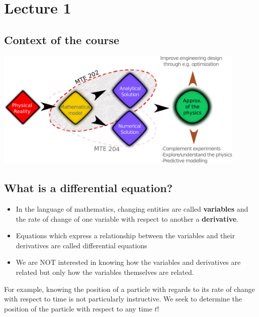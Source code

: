 \chapter*{Lecture 1}

\section*{Context of the course}


\includegraphics[width=0.9\textwidth]{figs/ConceptMap.pdf} 




\section{What is a differential equation?}

\begin{itemize}
\item In the language of mathematics, changing entities are called \textbf{variables} and the rate of change of one variable with respect to another a \textbf{derivative}.
\item Equations which express a relationship between the variables and their derivatives are called differential equations
\item We are NOT interested in knowing how the variables and derivatives are related but only how the variables themselves are related.
\end{itemize}

For example, knowing the position of a particle with regards to its rate of change with respect to time is not particularly instructive. We seek to determine the position of the particle with respect to any time $t$!



